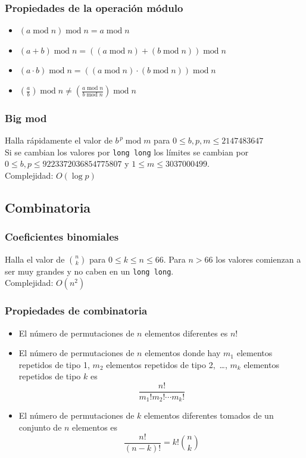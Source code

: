 \documentclass[10pt,letterpaper,twocolumn]{article}
\newcommand{\source}[1]{
  
  \dotfill
}
\begin{document}
    \subsubsection{Propiedades de la operación módulo}
    \begin{itemize}
      \item $(a \operatorname{mod} n) \operatorname{mod} n = a \operatorname{mod} n$
      \item $(a + b) \operatorname{mod} n = ((a \operatorname{mod} n) + (b\operatorname{mod} n)) \operatorname{mod} n$
      \item $(a \cdot b) \operatorname{mod} n = ((a \operatorname{mod} n) \cdot (b\operatorname{mod} n)) \operatorname{mod} n$
      \item $\displaystyle\left(\frac{a}{b} \right) \operatorname{mod} n \neq \left(\frac{a \operatorname{mod} n}{b\operatorname{mod} n}\right) \operatorname{mod} n$
    \end{itemize}

    \subsubsection{Big mod}
    Halla rápidamente el valor de $b^{\,p} \operatorname{mod} m$ para $0 \leq b,p,m \leq 2147483647$\\
    Si se cambian los valores por \verb|long long| los límites se cambian por $0 \leq b,p \leq 9223372036854775807$ y $1 \leq m \leq 3037000499$.\\
    Complejidad: $O(\operatorname{log} p)$\\
    \source{./src/bigmod.cpp}

  \subsection{Combinatoria}
    \subsubsection{Coeficientes binomiales}
    Halla el valor de $\binom{n}{k}$ para $0 \leq k \leq n \leq 66$. Para $n > 66$ los valores comienzan a ser muy grandes y no caben en un \verb|long long|.\\
    Complejidad: $O(n^2)$\\
    \source{./src/binomial.cpp}

    \subsubsection{Propiedades de combinatoria}
    \begin{itemize}
      \item El número de permutaciones de $n$ elementos diferentes es $n!$
      \item El número de permutaciones de $n$ elementos donde hay $m_1$ elementos repetidos de tipo 1, $m_2$ elementos repetidos de tipo 2,~\ldots, $m_k$ elementos repetidos de tipo $k$ es $$\frac{n!}{m_1! m_2! \cdots m_k!} $$
      \item El número de permutaciones de $k$ elementos diferentes tomados de un conjunto de $n$ elementos es $$ \frac{n!}{(n-k)!} = k! \binom{n}{k}$$
    \end{itemize}
\end{document}
